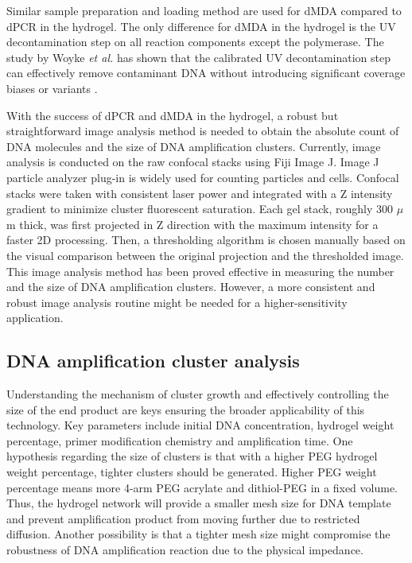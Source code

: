 Similar sample preparation and loading method are used for dMDA compared to dPCR in the hydrogel. The only difference for dMDA in the hydrogel is the UV decontamination step on all reaction components except the polymerase. The study by Woyke \textit{et al.} has shown that the calibrated UV decontamination step can effectively remove contaminant DNA without introducing significant coverage biases or variants \cite{Woyke:2011eg}. 

With the success of dPCR and dMDA in the hydrogel, a robust but straightforward image analysis method is needed to obtain the absolute count of DNA molecules and the size of DNA amplification clusters. Currently, image analysis is conducted on the raw confocal stacks using Fiji Image J. Image J particle analyzer plug-in is widely used for counting particles and cells. Confocal stacks were taken with consistent laser power and integrated with a Z intensity gradient to minimize cluster fluorescent saturation. Each gel stack, roughly 300 $\mu$m thick, was first projected in Z direction with the maximum intensity for a faster 2D processing. Then, a thresholding algorithm is chosen manually based on the visual comparison between the original projection and the thresholded image. This image analysis method has been proved effective in measuring the number and the size of DNA amplification clusters. However, a more consistent and robust image analysis routine might be needed for a higher-sensitivity application. 

\subsection{DNA amplification cluster analysis}
Understanding the mechanism of cluster growth and effectively controlling the size of the end product are keys ensuring the broader applicability of this technology. Key parameters include initial DNA concentration, hydrogel weight percentage, primer modification chemistry and amplification time. One hypothesis regarding the size of clusters is that with a higher PEG hydrogel weight percentage, tighter clusters should be generated. Higher PEG weight percentage means more 4-arm PEG acrylate and dithiol-PEG in a fixed volume. Thus, the hydrogel network will provide a smaller mesh size for DNA template and prevent amplification product from moving further due to restricted diffusion. Another possibility is that a tighter mesh size might compromise the robustness of DNA amplification reaction due to the physical impedance. 

